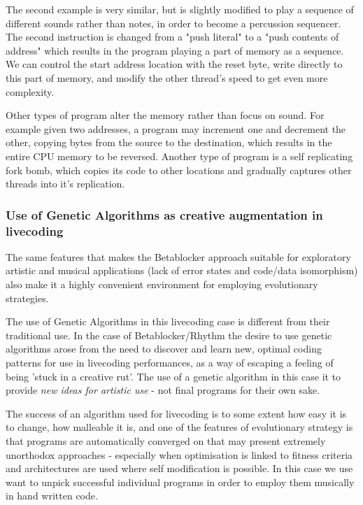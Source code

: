\documentclass[letterpaper, 12pt]{article}
\begin{document}
The second example is very similar, but is slightly modified to play a sequence of different sounds rather than notes, in order to become a percussion sequencer. The second instruction is changed from a "push literal" to a "push contents of address" which results in the program playing a part of memory as a sequence. We can control the start address location with the reset byte, write directly to this part of memory, and modify the other thread's speed to get even more complexity.

Other types of program alter the memory rather than focus on sound. 
For example given two addresses, a program may increment one and decrement the other, copying bytes from the source to the destination, which results in the entire CPU memory to be reversed. 
Another type of program is a self replicating fork bomb, which copies its code to other locations and gradually captures other threads into it's replication.

\parskip 18pt

\subsubsection{Use of Genetic Algorithms as creative augmentation in livecoding} %
\label{sub:genetic_programming}

The same features that makes the Betablocker approach suitable for exploratory artistic and musical applications (lack of error states and code/data isomorphism) also make it a highly convenient environment for employing evolutionary strategies.

The use of Genetic Algorithms \citep{barricelli1963numerical} in this livecoding case is different from their traditional use. In the case of Betablocker/Rhythm the desire to use genetic algorithms arose from the need to discover and learn new, optimal coding patterns for use in livecoding performances, as a way of escaping a feeling of being 'stuck in a creative rut'. The use of a genetic algorithm in this case it to provide \emph{new ideas for artistic use} - not final programs for their own sake.

The success of an algorithm used for livecoding is to some extent how easy it is to change, how malleable it is, and one of the features of evolutionary strategy is that programs are automatically converged on that may present extremely unorthodox approaches - especially when optimisation is linked to fitness criteria and architectures are used where self modification is possible. In this case we use want to unpick successful individual programs in order to employ them musically in hand written code.
\end{document}
